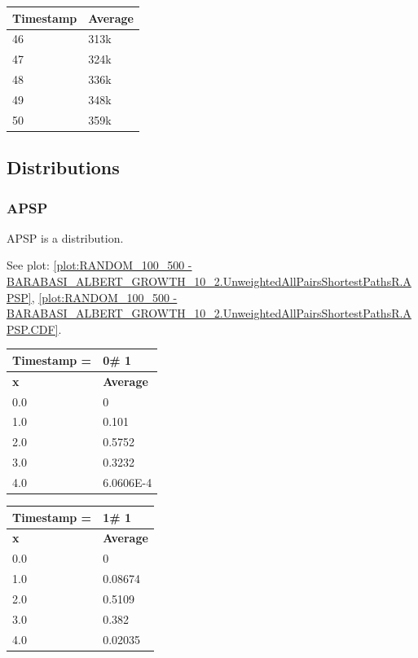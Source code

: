 \begin{tabular}{|l||l|}
\hline
	\textbf{Timestamp} & \textbf{Average} \\ \hline
	46 & 313k \\ \hline
	47 & 324k \\ \hline
	48 & 336k \\ \hline
	49 & 348k \\ \hline
	50 & 359k \\ \hline
\end{tabular}


\subsection{Distributions}
\subsubsection{APSP}
APSP is a distribution.

See plot: \ref{plot:RANDOM_100_500 - BARABASI_ALBERT_GROWTH_10_2.UnweightedAllPairsShortestPathsR.APSP}, \ref{plot:RANDOM_100_500 - BARABASI_ALBERT_GROWTH_10_2.UnweightedAllPairsShortestPathsR.APSP.CDF}.

%
%

\begin{tabular}{|l||l|}
\hline
\textbf{Timestamp =} & \textbf{0}\# 1\\\hline
	\textbf{x} & \textbf{Average} \\ \hline
\hline
	0.0 & 0 \\ \hline
	1.0 & 0.101 \\ \hline
	2.0 & 0.5752 \\ \hline
	3.0 & 0.3232 \\ \hline
	4.0 & 6.0606E-4 \\ \hline
\end{tabular}
\begin{tabular}{|l||l|}
\hline
\textbf{Timestamp =} & \textbf{1}\# 1\\\hline
	\textbf{x} & \textbf{Average} \\ \hline
\hline
	0.0 & 0 \\ \hline
	1.0 & 0.08674 \\ \hline
	2.0 & 0.5109 \\ \hline
	3.0 & 0.382 \\ \hline
	4.0 & 0.02035 \\ \hline
\end{tabular}

